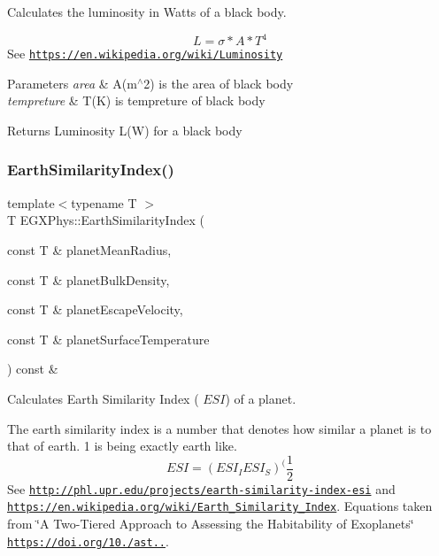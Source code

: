 Calculates the luminosity in Watts of a black body. 

\[L=\sigma*A*T^4\] See \href{https://en.wikipedia.org/wiki/Luminosity}{\tt https\+://en.\+wikipedia.\+org/wiki/\+Luminosity}


\begin{DoxyParams}{Parameters}
{\em area} & A(m$^\wedge$2) is the area of black body \\
\hline
{\em tempreture} & T(\+K) is tempreture of black body \\
\hline
\end{DoxyParams}
\begin{DoxyReturn}{Returns}
Luminosity L(\+W) for a black body 
\end{DoxyReturn}
\mbox{\label{group___astrophysics_ga057eb762bee8c3c74390eefc42589f12}} 
\subsubsection{\texorpdfstring{Earth\+Similarity\+Index()}{EarthSimilarityIndex()}}
{\footnotesize\ttfamily template$<$typename T $>$ \\
T E\+G\+X\+Phys\+::\+Earth\+Similarity\+Index (\begin{DoxyParamCaption}\item[{const T \&}]{planet\+Mean\+Radius,  }\item[{const T \&}]{planet\+Bulk\+Density,  }\item[{const T \&}]{planet\+Escape\+Velocity,  }\item[{const T \&}]{planet\+Surface\+Temperature }\end{DoxyParamCaption}) const \&}



Calculates Earth Similarity Index ( $ESI$) of a planet. 

The earth similarity index is a number that denotes how similar a planet is to that of earth. 1 is being exactly earth like. \[ESI=(ESI_I ESI_S)^(\frac{1}{2}\] See \href{http://phl.upr.edu/projects/earth-similarity-index-esi}{\tt http\+://phl.\+upr.\+edu/projects/earth-\/similarity-\/index-\/esi} and \href{https://en.wikipedia.org/wiki/Earth_Similarity_Index}{\tt https\+://en.\+wikipedia.\+org/wiki/\+Earth\+\_\+\+Similarity\+\_\+\+Index}. Equations taken from \char`\"{}\+A Two-\/\+Tiered Approach to Assessing the Habitability of Exoplanets\char`\"{} \href{https://doi.org/10.1089/ast.2010.0592}{\tt https\+://doi.\+org/10./ast..}.


